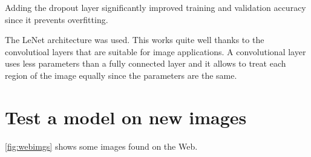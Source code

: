 \documentclass{article}
\begin{document}
Adding the dropout layer significantly improved training and validation accuracy since it prevents overfitting.

The LeNet architecture was used. This works quite well thanks to the convolutioal layers that are suitable for image applications. A convolutional layer uses less parameters than a fully connected layer and it allows to treat each region of the image equally since the parameters are the same.

\section{Test a model on new images}
\autoref{fig:webimgs} shows some images found on the Web.
\begin{figure}
\centering
{}
\\
\\

\end{figure}
\end{document}
